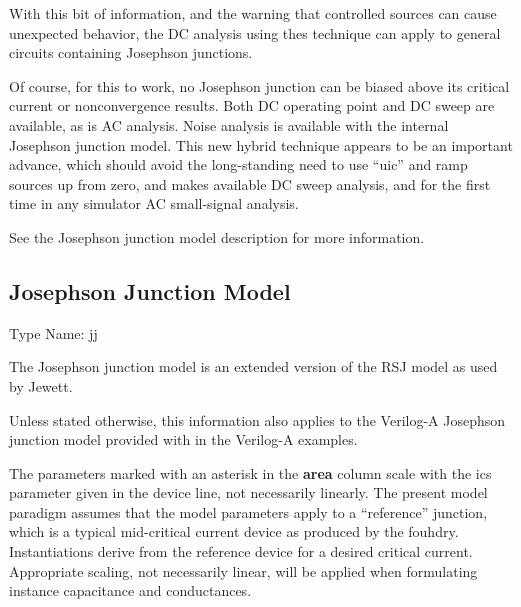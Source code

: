 With this bit of information, and the warning that controlled sources
can cause unexpected behavior, the DC analysis using thes technique
can apply to general circuits containing Josephson junctions.

Of course, for this to work, no Josephson junction can be biased above
its critical current or nonconvergence results.  Both DC operating
point and DC sweep are available, as is AC analysis.  Noise analysis
is available with the internal Josephson junction model.  This new
hybrid technique appears to be an important advance, which should
avoid the long-standing need to use ``{\vt uic}'' and ramp sources up
from zero, and makes available DC sweep analysis, and for the first
time in any simulator AC small-signal analysis.

See the Josephson junction model description for more information.


\subsection{Josephson Junction Model}
\label{jjmodel}


{\cb Type Name:} {\vt jj}

The Josephson junction model is an extended version of the RSJ model
as used by Jewett\cite{jewett}.

Unless stated otherwise, this information also applies to the
Verilog-A Josephson junction model provided with {\WRspice} in the
Verilog-A examples.

The parameters marked with an asterisk in the {\bf area} column scale
with the {\vt ics} parameter given in the device line, not necessarily
linearly.  The present model paradigm assumes that the model
parameters apply to a ``reference'' junction, which is a typical
mid-critical current device as produced by the fouhdry. 
Instantiations derive from the reference device for a desired critical
current.  Appropriate scaling, not necessarily linear, will be applied
when formulating instance capacitance and conductances.


